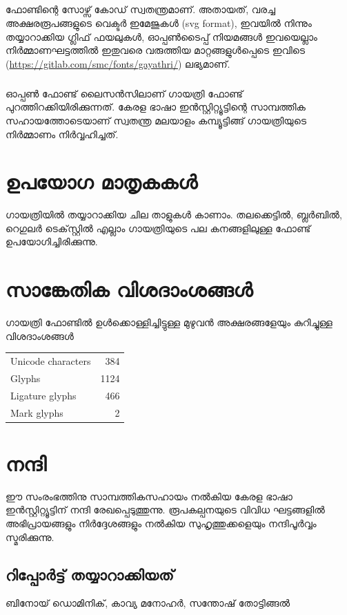 \documentclass[a4paper, 12pt]{report}
\begin{document}
	\paragraph{}
	ഫോണ്ടിന്റെ സോഴ്സ് കോഡ് സ്വതന്ത്രമാണ്. അതായത്, വരച്ച അക്ഷരരൂപങ്ങളുടെ വെക്ടര്‍ ഇമേജുകള്‍ (svg format), ഇവയില്‍ നിന്നും തയ്യാറാക്കിയ ഗ്ലിഫ് ഫയലുകള്‍, ഓപ്പണ്‍ടൈപ്പ്  നിയമങ്ങള്‍ ഇവയെല്ലാം നിര്‍മ്മാണഘട്ടത്തില്‍ ഇതുവരെ വരുത്തിയ മാറ്റങ്ങളുള്‍പ്പെടെ ഇവിടെ (\url{https://gitlab.com/smc/fonts/gayathri/}) ലഭ്യമാണ്.
	
	\paragraph{}
		ഓപ്പണ്‍ ഫോണ്ട് ലൈസന്‍സിലാണ് ഗായത്രി ഫോണ്ട് പുറത്തിറക്കിയിരിക്കുന്നത്.  കേരള ഭാഷാ ഇൻസ്റ്റിറ്റ്യൂട്ടിന്റെ സാമ്പത്തിക സഹായത്തോടെയാണ്  സ്വതന്ത്ര മലയാളം കമ്പ്യൂട്ടിങ്ങ് ഗായത്രിയുടെ നിർമ്മാണം നിർവ്വഹിച്ചത്.
	
	\newpage
	\clearpage
	
	\chapter*{ഉപയോഗ മാതൃകകള്‍‍}
	
	ഗായത്രിയിൽ തയ്യാറാക്കിയ ചില താളുകൾ കാണാം. തലക്കെട്ടിൽ, ബ്ലർബിൽ, റെഗുലർ ടെക്‌സ്റ്റിൽ എല്ലാം ഗായത്രിയുടെ പല കനങ്ങളിലുള്ള  ഫോണ്ട് ഉപയോഗിച്ചിരിക്കുന്നു.

	
	
	
	\chapter*{സാങ്കേതിക വിശദാംശങ്ങള്‍}
	
	ഗായത്രി ഫോണ്ടില്‍ ഉള്‍ക്കൊള്ളിച്ചിട്ടുള്ള മുഴുവന്‍ അക്ഷരങ്ങളേയും കുറിച്ചുള്ള വിശദാംശങ്ങൾ 
	\\[1cm]

    \begin{tabular}[l]{|l|r|}
    \hline
  Unicode characters & 384 \\
Glyphs & 1124 \\
Ligature glyphs & 466 \\
Mark glyphs & 2 \\\hline
\end{tabular}

	
	
	\chapter*{നന്ദി}
	ഈ സംരംഭത്തിനു സാമ്പത്തികസഹായം നൽകിയ കേരള ഭാഷാ ഇൻസ്റ്റിറ്റ്യൂട്ടിന് നന്ദി രേഖപ്പെടുത്തുന്നു.
	രൂപകല്പനയുടെ വിവിധ ഘട്ടങ്ങളിൽ അഭിപ്രായങ്ങളും നിർദ്ദേശങ്ങളും നൽകിയ സുഹൃത്തുക്കളെയും നന്ദിപൂർവ്വം സ്മരിക്കുന്നു.
	
	\section*{റിപ്പോർട്ട് തയ്യാറാക്കിയത്}
	ബിനോയ് ഡൊമിനിക്, കാവ്യ മനോഹർ, സന്തോഷ് തോട്ടിങ്ങൽ
\end{document}
